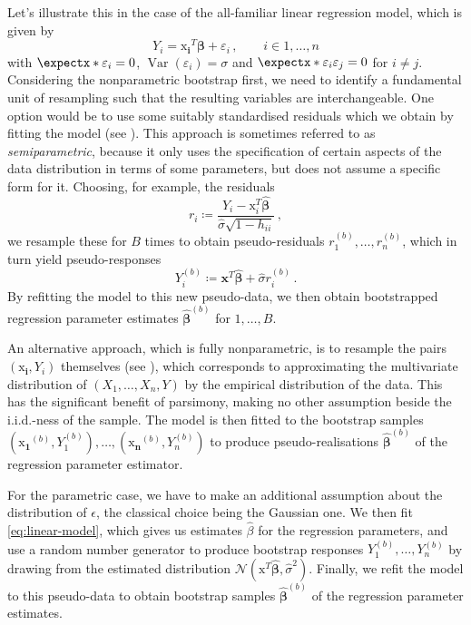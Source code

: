 \documentclass[a4paper]{book}
\begin{document}
Let's illustrate this in the case of the all-familiar linear regression model, which is given by
\begin{equation} \label{eq:linear-model}
  Y_i = \bm{\mathrm{x}_i}^T \bm{\beta} + \varepsilon_i \,, \qquad i \in {1, \dots, n}
\end{equation}
with $\expect{\varepsilon_i} = 0$, $\operatorname{Var}(\varepsilon_i) = \sigma$ and $\expect{\varepsilon_i \varepsilon_j} = 0$ for $i \neq j$. Considering the nonparametric bootstrap first, we need to identify a fundamental unit of resampling such that the resulting variables are interchangeable. One option would be to use some suitably standardised residuals which we obtain by fitting the model (see \cite[Algorithm 6.1]{davison}). This approach is sometimes referred to as \emph{semiparametric}, because it only uses the specification of certain aspects of the data distribution in terms of some parameters, but does not assume a specific form for it. Choosing, for example, the residuals
\begin{equation}
  r_i \coloneqq \frac{Y_i - \bm{\mathrm{x}}^T_i \widehat{\bm{\beta}}}{\widehat{\sigma} \sqrt{1 - h_{ii}}} \,,
\end{equation}
we resample these for $B$ times to obtain pseudo-residuals $r^{(b)}_1, \dots, r^{(b)}_n$, which in turn yield  pseudo-responses
\begin{equation}
  Y_i^{(b)} \coloneqq \mathbf{x}^T \widehat{\bm{\beta}} + \widehat{\sigma} r^{(b)}_i \,.
\end{equation}
By refitting the model to this new pseudo-data, we then obtain bootstrapped regression parameter estimates $\widehat{\bm{\beta}}^{(b)}$ for $1, \dots, B$.

An alternative approach, which is fully nonparametric, is to resample the pairs $(\bm{\mathrm{x}_i}, Y_i)$ themselves (see \cites[Section 9.5]{efron:intro}[Algorithm 6.2]{davison}), which corresponds to approximating the multivariate distribution of $(X_1, \dots, X_n, Y)$ by the empirical distribution of the data. This has the significant benefit of parsimony, making no other assumption beside the i.i.d.-ness of the sample. The model is then fitted to the bootstrap samples $(\bm{\mathrm{x}_1}^{(b)}, Y^{(b)}_1), \dots, (\bm{\mathrm{x}_n}^{(b)}, Y^{(b)}_n)$ to produce pseudo-realisations $\widehat{\bm{\beta}}^{(b)}$ of the regression parameter estimator.

For the parametric case, we have to make an additional assumption about the distribution of $\epsilon$, the classical choice being the Gaussian one. We then fit \cref{eq:linear-model}, which gives us estimates $\widehat{\beta}$ for the regression parameters, and use a random number generator to produce bootstrap responses $Y^{(b)}_1, \dots, Y^{(b)}_n$ by drawing from the estimated distribution $\mathcal{N}(\bm{\mathrm{x}}^T \widehat{\bm{\beta}}, \widehat{\sigma}^2)$. Finally, we refit the model to this pseudo-data to obtain bootstrap samples $\widehat{\bm{\beta}}^{(b)}$ of the regression parameter estimates.
\end{document}
